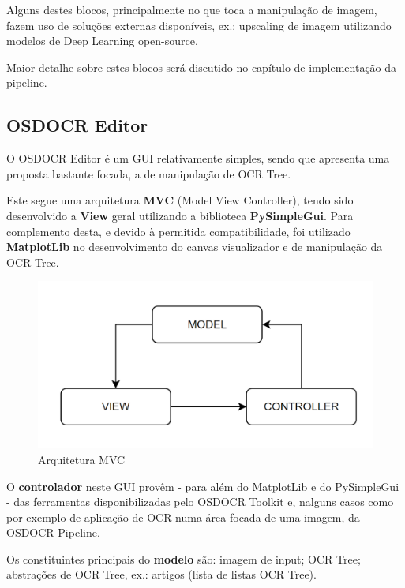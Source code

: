 Alguns destes blocos, principalmente no que toca a manipulação de imagem, fazem uso de soluções externas disponíveis, ex.: upscaling de imagem utilizando modelos de Deep Learning open-source.

Maior detalhe sobre estes blocos será discutido no capítulo de implementação da pipeline.


\subsection{OSDOCR Editor}

O OSDOCR Editor é um GUI relativamente simples, sendo que apresenta uma proposta bastante focada, a de manipulação de OCR Tree. 

Este segue uma arquitetura \textbf{MVC} (Model View Controller), tendo sido desenvolvido a \textbf{View} geral utilizando a biblioteca \textbf{PySimpleGui}. Para complemento desta, e devido à permitida compatibilidade, foi utilizado \textbf{MatplotLib} no desenvolvimento do canvas visualizador e de manipulação da OCR Tree.

\begin{figure}[H]
	\centering
	\includegraphics[width=1\textwidth]{images/diagramas/MVC.png}
	\caption{Arquitetura MVC}
	\label{fig:arquitetura_mvc}
\end{figure}

O \textbf{controlador} neste GUI provêm - para além do MatplotLib e do PySimpleGui - das ferramentas disponibilizadas pelo OSDOCR Toolkit e, nalguns casos como por exemplo de aplicação de OCR numa área focada de uma imagem, da OSDOCR Pipeline.

Os constituintes principais do \textbf{modelo} são: imagem de input; OCR Tree; abstrações de OCR Tree, ex.: artigos (lista de listas OCR Tree).








